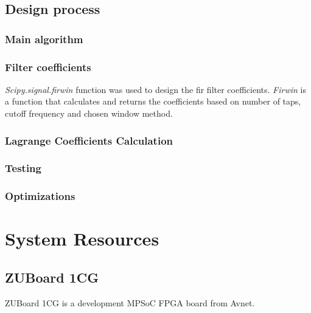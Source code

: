 \subsection{Design process}

\subsubsection{Main algorithm}


\subsubsection{Filter coefficients}
\textit{Scipy.signal.firwin} function was used to design the \acrshort{fir} filter coefficients. \textit{Firwin} is a function that calculates and returns the coefficients based on number of taps, cutoff frequency and chosen window method.

\subsubsection{Lagrange Coefficients Calculation}

\subsubsection{Testing}


\subsubsection{Optimizations}

\section{System Resources}
\subsection{ZUBoard 1CG}
ZUBoard 1CG is a development MPSoC FPGA board from Avnet.


